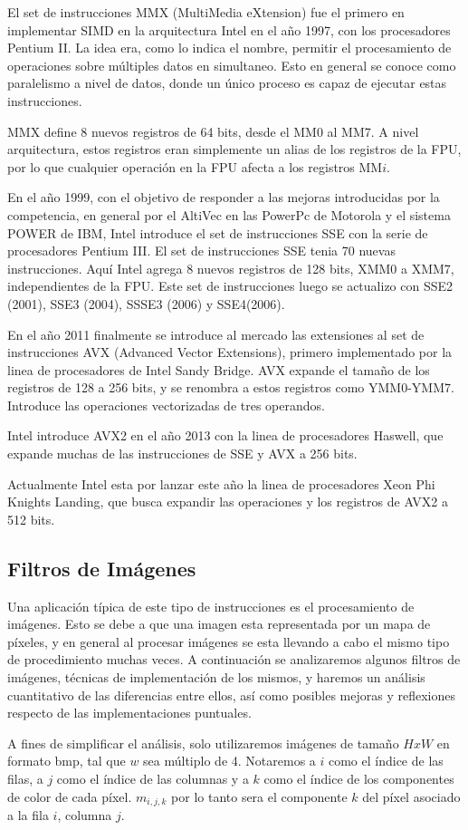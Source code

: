El set de instrucciones MMX (MultiMedia eXtension) fue el primero en implementar SIMD en la arquitectura Intel en el año 1997, con los procesadores Pentium II. La idea era, como lo indica el nombre, permitir el procesamiento de operaciones sobre múltiples datos en simultaneo. Esto en general se conoce como paralelismo a nivel de datos, donde un único proceso es capaz de ejecutar estas instrucciones.

MMX define 8 nuevos registros de 64 bits, desde el MM0 al MM7. A nivel arquitectura, estos registros eran simplemente un alias de los registros de la FPU, por lo que cualquier operación en la FPU afecta a los registros MM$i$.

En el año 1999, con el objetivo de responder a las mejoras introducidas por la competencia, en general por el AltiVec en las PowerPc de Motorola y el sistema POWER de IBM, Intel introduce el set de instrucciones SSE con la serie de procesadores Pentium III. El set de instrucciones SSE tenia 70 nuevas instrucciones. Aquí Intel agrega 8 nuevos registros de 128 bits, XMM0 a XMM7, independientes de la FPU. Este set de instrucciones luego se actualizo con SSE2 (2001), SSE3 (2004), SSSE3 (2006) y SSE4(2006).

En el año 2011 finalmente se introduce al mercado las extensiones al set de instrucciones AVX (Advanced Vector Extensions), primero implementado por la linea de procesadores de Intel Sandy Bridge. AVX expande el tamaño de los registros de 128 a 256 bits, y se renombra a estos registros como YMM0-YMM7. Introduce las operaciones vectorizadas de tres operandos. 

Intel introduce AVX2 en el año 2013 con la linea de procesadores Haswell, que expande muchas de las instrucciones de SSE y AVX a 256 bits.

Actualmente Intel esta por lanzar este año la linea de procesadores Xeon Phi Knights Landing, que busca expandir las operaciones y los registros de AVX2 a 512 bits.

\subsection{Filtros de Imágenes}

Una aplicación típica de este tipo de instrucciones es el procesamiento de imágenes. Esto se debe a que una imagen esta representada por un mapa de píxeles, y en general al procesar imágenes se esta llevando a cabo el mismo tipo de procedimiento muchas veces. A continuación se analizaremos algunos filtros de imágenes, técnicas de implementación de los mismos, y haremos un análisis cuantitativo de las diferencias entre ellos, así como posibles mejoras y reflexiones respecto de las implementaciones puntuales.

A fines de simplificar el análisis, solo utilizaremos imágenes de tamaño $HxW$ en formato bmp, tal que $w$ sea múltiplo de 4. Notaremos a $i$ como el índice de las filas, a $j$ como el índice de las columnas y a $k$ como el índice de los componentes de color de cada píxel. $m_{i, j, k}$ por lo tanto sera el componente $k$ del píxel asociado a la fila $i$, columna $j$.
